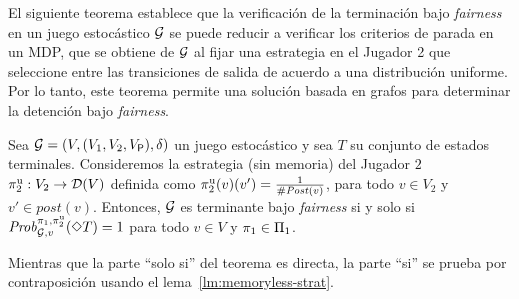 El siguiente teorema establece que la verificación de la terminación bajo \textit{fairness} en un juego estocástico $\mathcal{G}$ se puede reducir a verificar los criterios de parada en un MDP, que se obtiene de $\mathcal{G}$ al fijar una estrategia en el Jugador 2 que seleccione entre las transiciones de salida de acuerdo a una
distribución uniforme. Por lo tanto, este teorema permite una solución basada en grafos para determinar la detención bajo \textit{fairness}.


\begin{theorem}\label{thm:uniform-prob}
  Sea $\mathcal{G} = (V, (V_1, V_2, V_{\mathsf{P}}), \delta)$ un juego estocástico y sea $T$ su conjunto de estados terminales.
  Consideremos la estrategia (sin memoria) del Jugador $2$
  $\pi^{\mathrm{u}}_{2} : V_2 \rightarrow \mathcal{D}(V)$ definida como
  $\pi^{\mathrm{u}}_{2}(v)(v') = \frac{1}{\# \mathit{Post}(v)}$, para todo $v \in
  V_2$ y $v' \in post(v)$.
  Entonces, $\mathcal{G}$ es terminante bajo \textit{fairness} si y solo si
  $\mathit{Prob}^{\pi_{1}, \pi^{\mathrm{u}}_{2}}_{\mathcal{G},v}(\Diamond T)=1$ para
  todo $v\in V$ y $\pi_{1} \in \Pi_{1}$.
\end{theorem}

Mientras que la parte ``solo si'' del teorema es directa, la parte ``si'' se prueba por
contraposición usando el lema~\ref{lm:memoryless-strat}.

